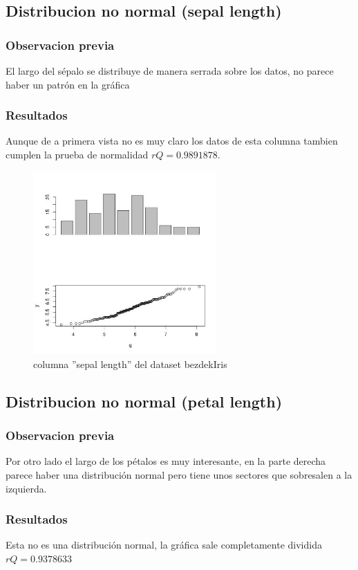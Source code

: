 \documentclass[10pt]{article}
\begin{document}
\subsection*{Distribucion no normal (sepal length)}
\label{sec:orgee5ee91}
\subsubsection*{Observacion previa}
\label{sec:org4ab1fe1}
El largo del sépalo se distribuye de manera serrada sobre los datos, no parece haber un patrón en la gráfica

\subsubsection*{Resultados}
\label{sec:org67de33c}
Aunque de a primera vista no es muy claro los datos de esta columna tambien cumplen la prueba de normalidad \(rQ = 0.9891878\).

\begin{figure}[htbp]
\centering
\includegraphics[width=7cm]{img/i2.jpeg}
\caption{columna ''sepal length'' del dataset bezdekIris}
\end{figure}

\subsection*{Distribucion no normal (petal length)}
\label{sec:org14834fc}
\subsubsection*{Observacion previa}
\label{sec:org31b8f16}
Por otro lado el largo de los pétalos es muy interesante, en la parte derecha parece haber una distribución normal pero tiene unos sectores que sobresalen a la izquierda.

\subsubsection*{Resultados}
\label{sec:org555b294}
Esta no es una distribución normal, la gráfica sale completamente dividida \(rQ = 0.9378633\)
\end{document}
